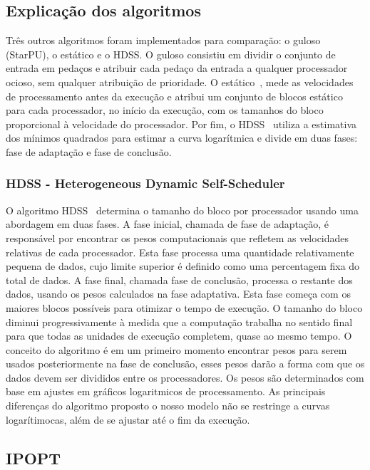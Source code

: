 \subsection{Explicação dos algoritmos}

Três outros algoritmos foram implementados para comparação: o guloso (StarPU), o estático e o
HDSS. O guloso consistiu em dividir o conjunto de entrada em pedaços e atribuir 
cada pedaço da entrada a qualquer processador ocioso, sem qualquer atribuição de prioridade. O estático~\citep{raphael}, mede as velocidades de processamento antes da execução e  atribui um conjunto  de blocos estático para cada processador, no início da execução, com os
tamanhos do bloco proporcional à velocidade do processador. Por fim, o HDSS~\citep{HDSS}  
utiliza a estimativa dos mínimos quadrados para estimar a curva logarítmica e divide em duas fases: fase de adaptação e fase de conclusão. 

\subsubsection{HDSS - Heterogeneous Dynamic Self-Scheduler}

O algoritmo HDSS~\citep{HDSS} determina o tamanho do bloco por processador usando uma abordagem em duas fases. A fase inicial, chamada de fase de adaptação, é responsável por encontrar os pesos computacionais que refletem as velocidades relativas de cada processador. Esta fase processa uma quantidade relativamente pequena de dados, cujo limite superior é definido como uma percentagem fixa do total de dados. A fase final, chamada fase de conclusão, processa o restante dos dados, usando os pesos calculados na fase adaptativa. Esta fase começa com os maiores blocos possíveis para otimizar o tempo de execução. O tamanho do bloco diminui progressivamente à medida que a computação trabalha no sentido final para que todas as unidades de execução completem, quase ao mesmo tempo.  O conceito do algoritmo é em um primeiro momento encontrar pesos para serem usados posteriormente na fase de conclusão, esses pesos darão a forma com que os dados devem ser divididos entre os processadores.  Os pesos são determinados com base em ajustes em gráficos logaritmicos de processamento. As principais diferenças do algoritmo proposto o nosso modelo não se restringe a curvas logarítimocas, além de se ajustar até o fim da execução.



\subsection{IPOPT}

